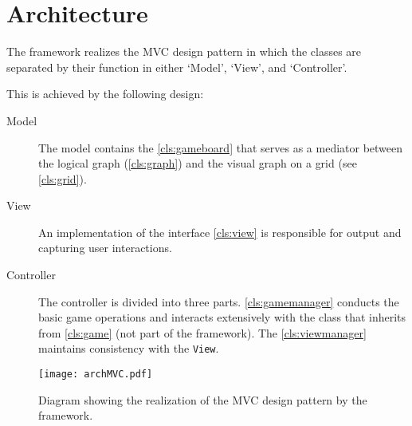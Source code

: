 \section{Architecture}
The \graphioli \gls{framework} realizes the \gls{MVC} design pattern in which the classes are separated by their function in either `Model', `View', and `Controller'.\par
This is achieved by the following design:\par

\begin{description}
	\item[Model] The model contains the \ref{cls:gameboard} that serves as a mediator between the logical \gls{graph} (\ref{cls:graph}) and the visual graph on a \gls{grid} (see \ref{cls:grid}).
	\item[View] An implementation of the \gls{interface} \ref{cls:view} is responsible for output and capturing user interactions.
	\item[Controller] The controller is divided into three parts. \ref{cls:gamemanager} conducts the basic game operations and interacts extensively with the class that inherits from \ref{cls:game} (not part of the framework). The \ref{cls:viewmanager} maintains consistency with the \texttt{View}.
\end{description}

\begin{figure}[h]
	\centering
	\texttt{[image: archMVC.pdf]}
	\caption{Diagram showing the realization of the \gls{MVC} design pattern by the framework.}
	\label{img:archMVC}
\end{figure}
